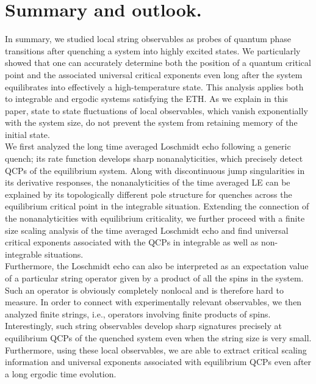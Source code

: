 \documentclass[aps,prx,twocolumn]{revtex4-2}
\begin{document}
{\section{Summary and outlook.}
\label{sec:conclusion}

In summary,  we  studied local string observables as probes of quantum phase transitions after quenching a system into highly excited states. We particularly showed that one can accurately determine both the position of a quantum critical point and the associated universal critical exponents even long after the system equilibrates into effectively a high-temperature state. This analysis applies both to integrable and ergodic systems satisfying the ETH.  As we explain in this paper,  state to state fluctuations of local observables, which vanish
exponentially with the system size, do not prevent the system from retaining memory of the initial state.\\

 {We first analyzed} the long time averaged Loschmidt echo following a generic quench; its rate function develops sharp nonanalyticities,  which precisely detect QCPs of the equilibrium system. Along with discontinuous jump singularities in its derivative responses, the nonanalyticities of the time averaged LE can be explained by its topologically different pole structure for quenches across the equilibrium critical point in the integrable situation.  Extending the connection of the nonanalyticities with equilibrium criticality, we further proceed with a finite size scaling analysis of the time averaged Loschmidt echo and find universal critical exponents associated with the QCPs in integrable as well as non-integrable situations.  \\
 
  {Furthermore, the Loschmidt echo can also be interpreted  as an expectation value of a particular string operator given by a product of all the spins in the system.  Such an operator is obviously completely  nonlocal and is therefore hard to measure.  In order to  connect with experimentally relevant observables,  we then analyzed finite strings, i.e.,  operators involving finite products of spins.}  {Interestingly,  such string observables develop sharp signatures precisely at equilibrium QCPs of the quenched system even when the string size is very small.  Furthermore, using these local observables, we are able to extract critical scaling information and universal exponents associated with equilibrium QCPs even after a long ergodic time evolution.\\

}}
\end{document}

